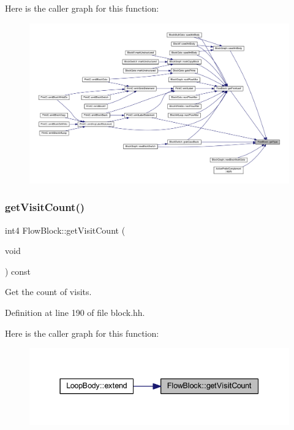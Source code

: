 Here is the caller graph for this function\+:
\nopagebreak
\begin{figure}[H]
\begin{center}
\leavevmode
\includegraphics[width=350pt]{class_flow_block_ae036068cc610d97a5461f9bcf75bd43d_icgraph}
\end{center}
\end{figure}
\mbox{\label{class_flow_block_a428b120c7f39be662e4b82ffb62f98bb}} 
\subsubsection{\texorpdfstring{getVisitCount()}{getVisitCount()}}
{\footnotesize\ttfamily int4 Flow\+Block\+::get\+Visit\+Count (\begin{DoxyParamCaption}\item[{void}]{ }\end{DoxyParamCaption}) const\hspace{0.3cm}{\ttfamily [inline]}}



Get the count of visits. 



Definition at line 190 of file block.\+hh.

Here is the caller graph for this function\+:
\nopagebreak
\begin{figure}[H]
\begin{center}
\leavevmode
\includegraphics[width=337pt]{class_flow_block_a428b120c7f39be662e4b82ffb62f98bb_icgraph}
\end{center}
\end{figure}
\mbox{\label{class_flow_block_a3eb121264843793d0bb58704c05ee710}} 
